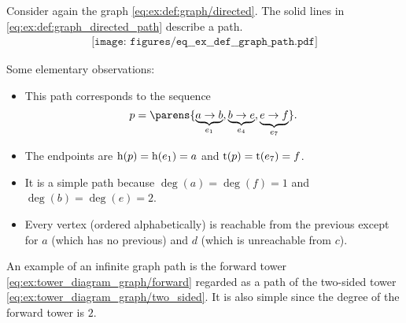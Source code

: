 \begin{example}\label{ex:def:graph_directed_path}
  Consider again the graph \eqref{eq:ex:def:graph/directed}. The solid lines in \eqref{eq:ex:def:graph_directed_path} describe a path.
  \begin{equation}\label{eq:ex:def:graph_directed_path}
    \begin{aligned}
      \texttt{[image: figures/eq\_\_ex\_\_def\_\_graph\_path.pdf]}
    \end{aligned}
  \end{equation}

  Some elementary observations:
  \begin{itemize}
    \item This path corresponds to the sequence
    \begin{equation*}
      p = \parens{ \underbrace{a \to b}_{e_1}, \underbrace{b \to e}_{e_4}, \underbrace{e \to f}_{e_7} }.
    \end{equation*}

    \item The endpoints are \( \operatorname{h}(p) = \operatorname{h}(e_1) = a \) and \( \operatorname{t}(p) = \operatorname{t}(e_7) = f \).

    \item It is a simple path because \( \deg(a) = \deg(f) = 1 \) and \( \deg(b) = \deg(e) = 2 \).

    \item Every vertex (ordered alphabetically) is reachable from the previous except for \( a \) (which has no previous) and \( d \) (which is unreachable from \( c \)).
  \end{itemize}

  An example of an infinite graph path is the forward tower \eqref{eq:ex:tower_diagram_graph/forward} regarded as a path of the two-sided tower \eqref{eq:ex:tower_diagram_graph/two_sided}. It is also simple since the degree of the forward tower is \( 2 \).
\end{example}

